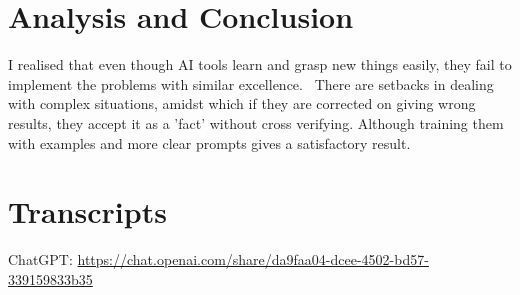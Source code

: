 \documentclass{article}
\begin{document}
 \section{Analysis and Conclusion}
I realised that even though AI tools learn and grasp new things easily, they fail to implement the problems with similar excellence. \
There are setbacks in dealing with complex situations, amidst which if they are corrected on giving wrong results, they accept it as a 'fact' without cross verifying. Although training them with examples and more clear prompts gives a satisfactory result.


 \section{Transcripts}
 ChatGPT: \url{https://chat.openai.com/share/da9faa04-dcee-4502-bd57-339159833b35} 
 
\end{document}
